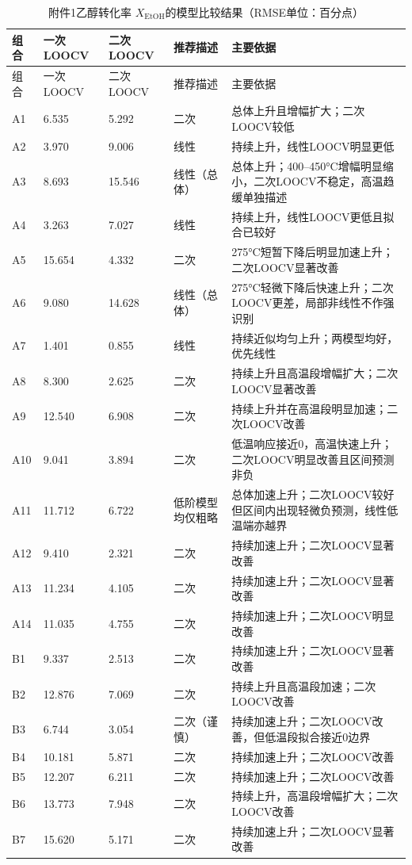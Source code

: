 \begin{longtable}{C{0.07\textwidth}C{0.11\textwidth}C{0.11\textwidth}L{0.16\textwidth}L{0.42\textwidth}}
\caption{附件1乙醇转化率 $X_{\mathrm{EtOH}}$的模型比较结果（RMSE单位：百分点）}\label{tab:q1-conversion-comparison}\\
\toprule
组合 & 一次LOOCV & 二次LOOCV & 推荐描述 & 主要依据 \\
\midrule
\endfirsthead
\toprule
组合 & 一次LOOCV & 二次LOOCV & 推荐描述 & 主要依据 \\
\midrule
\endhead
A1 & 6.535 & 5.292 & 二次 & 总体上升且增幅扩大；二次LOOCV较低 \\
A2 & 3.970 & 9.006 & 线性 & 持续上升，线性LOOCV明显更低 \\
A3 & 8.693 & 15.546 & 线性（总体） & 总体上升；400--450°C增幅明显缩小，二次LOOCV不稳定，高温趋缓单独描述 \\
A4 & 3.263 & 7.027 & 线性 & 持续上升，线性LOOCV更低且拟合已较好 \\
A5 & 15.654 & 4.332 & 二次 & 275°C短暂下降后明显加速上升；二次LOOCV显著改善 \\
A6 & 9.080 & 14.628 & 线性（总体） & 275°C轻微下降后快速上升；二次LOOCV更差，局部非线性不作强识别 \\
A7 & 1.401 & 0.855 & 线性 & 持续近似均匀上升；两模型均好，优先线性 \\
A8 & 8.300 & 2.625 & 二次 & 持续上升且高温段增幅扩大；二次LOOCV显著改善 \\
A9 & 12.540 & 6.908 & 二次 & 持续上升并在高温段明显加速；二次LOOCV改善 \\
A10 & 9.041 & 3.894 & 二次 & 低温响应接近0，高温快速上升；二次LOOCV明显改善且区间预测非负 \\
A11 & 11.712 & 6.722 & 低阶模型均仅粗略 & 总体加速上升；二次LOOCV较好但区间内出现轻微负预测，线性低温端亦越界 \\
A12 & 9.410 & 2.321 & 二次 & 持续加速上升；二次LOOCV显著改善 \\
A13 & 11.234 & 4.105 & 二次 & 持续加速上升；二次LOOCV显著改善 \\
A14 & 11.035 & 4.755 & 二次 & 持续加速上升；二次LOOCV明显改善 \\
B1 & 9.337 & 2.513 & 二次 & 持续加速上升；二次LOOCV显著改善 \\
B2 & 12.876 & 7.069 & 二次 & 持续上升且高温段加速；二次LOOCV改善 \\
B3 & 6.744 & 3.054 & 二次（谨慎） & 持续加速上升；二次LOOCV改善，但低温段拟合接近0边界 \\
B4 & 10.181 & 5.871 & 二次 & 持续加速上升；二次LOOCV改善 \\
B5 & 12.207 & 6.211 & 二次 & 持续加速上升；二次LOOCV改善 \\
B6 & 13.773 & 7.948 & 二次 & 持续上升，高温段增幅扩大；二次LOOCV改善 \\
B7 & 15.620 & 5.171 & 二次 & 持续加速上升；二次LOOCV显著改善 \\
\bottomrule
\end{longtable}
